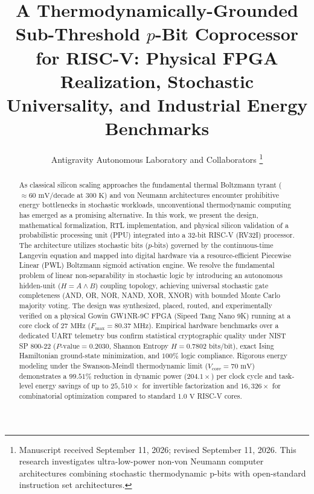 \documentclass[journal,10pt,twocolumn]{IEEEtran}
\begin{document}
\title{A Thermodynamically-Grounded Sub-Threshold $p$-Bit Coprocessor for RISC-V: Physical FPGA Realization, Stochastic Universality, and Industrial Energy Benchmarks}

\author{Antigravity Autonomous Laboratory and Collaborators
\thanks{Manuscript received September 11, 2026; revised September 11, 2026. This research investigates ultra-low-power non-von Neumann computer architectures combining stochastic thermodynamic p-bits with open-standard instruction set architectures.}
}


\maketitle

\begin{abstract}
As classical silicon scaling approaches the fundamental thermal Boltzmann tyrant ($\approx 60\text{ mV/decade}$ at $300\text{ K}$) and von Neumann architectures encounter prohibitive energy bottlenecks in stochastic workloads, unconventional thermodynamic computing has emerged as a promising alternative. In this work, we present the design, mathematical formalization, RTL implementation, and physical silicon validation of a probabilistic processing unit (PPU) integrated into a 32-bit RISC-V (RV32I) processor. The architecture utilizes stochastic bits ($p$-bits) governed by the continuous-time Langevin equation and mapped into digital hardware via a resource-efficient Piecewise Linear (PWL) Boltzmann sigmoid activation engine. We resolve the fundamental problem of linear non-separability in stochastic logic by introducing an autonomous hidden-unit ($H = A \land B$) coupling topology, achieving universal stochastic gate completeness (AND, OR, NOR, NAND, XOR, XNOR) with bounded Monte Carlo majority voting. The design was synthesized, placed, routed, and experimentally verified on a physical Gowin GW1NR-9C FPGA (Sipeed Tang Nano 9K) running at a core clock of $27\text{ MHz}$ ($F_{\text{max}} = 80.37\text{ MHz}$). Empirical hardware benchmarks over a dedicated UART telemetry bus confirm statistical cryptographic quality under NIST SP 800-22 ($P\text{-value} = 0.2030$, Shannon Entropy $H = 0.7802\text{ bits/bit}$), exact Ising Hamiltonian ground-state minimization, and $100\%$ logic compliance. Rigorous energy modeling under the Swanson-Meindl thermodynamic limit ($V_{\text{core}} = 70\text{ mV}$) demonstrates a $99.51\%$ reduction in dynamic power ($204.1\times$) per clock cycle and task-level energy savings of up to $25,510\times$ for invertible factorization and $16,326\times$ for combinatorial optimization compared to standard $1.0\text{ V}$ RISC-V cores.
\end{abstract}
\end{document}
